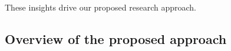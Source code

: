 These insights drive our proposed research approach. 







\subsection{Overview of the proposed approach} 

